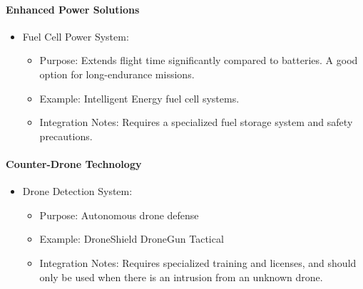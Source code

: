 \paragraph{Enhanced Power Solutions}
\begin{itemize}
\item Fuel Cell Power System:
\begin{itemize}
\item Purpose: Extends flight time significantly compared to batteries. A good option for long-endurance missions.
\item Example: Intelligent Energy fuel cell systems.
\item Integration Notes: Requires a specialized fuel storage system and safety precautions.
\end{itemize}
\end{itemize}

\paragraph{Counter-Drone Technology}
\begin{itemize}
\item Drone Detection System:
\begin{itemize}
\item Purpose: Autonomous drone defense
\item Example: DroneShield DroneGun Tactical
\item Integration Notes: Requires specialized training and licenses, and should only be used when there is an intrusion from an unknown drone.
\end{itemize}
\end{itemize}